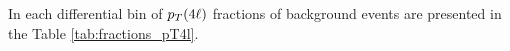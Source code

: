 In each differential bin of $p_T(4\ell)$ fractions of background events are presented in the Table \ref{tab:fractions_pT4l}. 


